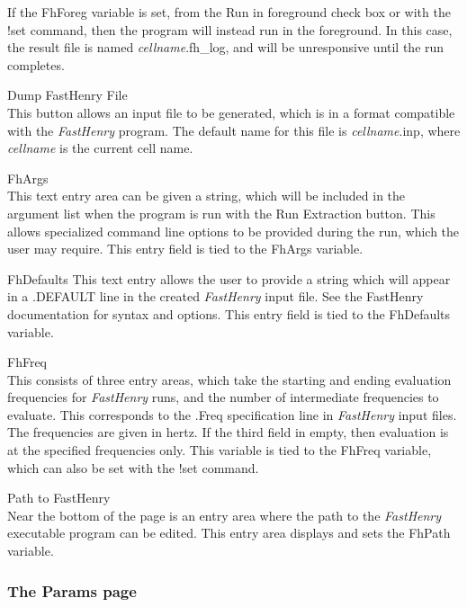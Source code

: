 \begin{description}
If the {\et FhForeg} variable is set, from the {\cb Run in foreground}
check box or with the {\cb !set} command, then the program will
instead run in the foreground.  In this case, the result file is named
{\it cellname\/}{\vt .fh\_log}, and {\Xic} will be unresponsive until
the run completes.

\item{\cb Dump FastHenry File}\\
This button allows an input file to be generated, which is in a format
compatible with the {\it FastHenry} program.  The default name for
this file is {\it cellname\/}{\vt .inp}, where {\it cellname} is the
current cell name.

\item{\cb FhArgs}\\
This text entry area can be given a string, which will be included in
the argument list when the program is run with the {\cb Run
Extraction} button.  This allows specialized command line options to
be provided during the run, which the user may require.  This entry
field is tied to the {\et FhArgs} variable.

\item{FhDefaults}
This text entry allows the user to provide a string which will appear
in a {\vt .DEFAULT} line in the created {\it FastHenry} input file. 
See the FastHenry documentation for syntax and options.  This entry
field is tied to the {\et FhDefaults} variable.

\item{\cb FhFreq}\\
This consists of three entry areas, which take the starting and ending
evaluation frequencies for {\it FastHenry} runs, and the number of
intermediate frequencies to evaluate.  This corresponds to the {\vt
.Freq} specification line in {\it FastHenry} input files.  The
frequencies are given in hertz.  If the third field in empty, then
evaluation is at the specified frequencies only.  This variable is
tied to the {\et FhFreq} variable, which can also be set with the {\cb
!set} command.

\item{\cb Path to FastHenry}\\
Near the bottom of the page is an entry area where the path to the
{\it FastHenry} executable program can be edited.  This entry area
displays and sets the {\et FhPath} variable.
\end{description}

\subsubsection{The Params page}

